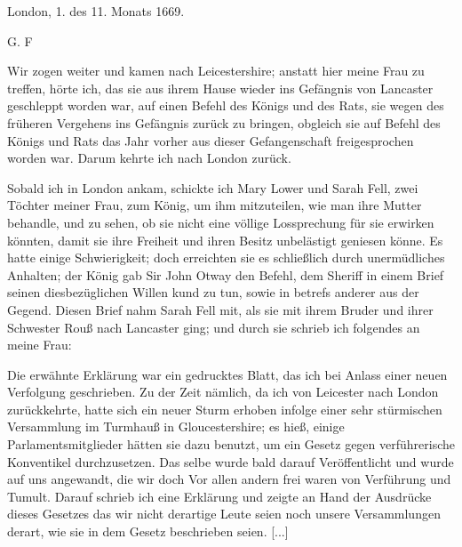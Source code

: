 {  \begin{flushright}
  London, 1. des 11. Monats 1669. 

  G. F 
  \end{flushright}

}

Wir zogen weiter und kamen nach Leicestershire; anstatt
hier meine Frau zu treffen, hörte ich, das sie aus ihrem Hause
wieder ins Gefängnis von Lancaster geschleppt worden war,
auf einen Befehl des Königs und des Rats, sie wegen des
früheren Vergehens ins Gefängnis zurück zu bringen, obgleich
sie auf Befehl des Königs und Rats das Jahr vorher aus dieser
Gefangenschaft freigesprochen worden war. Darum kehrte ich nach
London zurück.

Sobald ich in London ankam, schickte ich Mary Lower und
Sarah Fell, zwei Töchter meiner Frau, zum König, um ihm 
mitzuteilen, wie man ihre Mutter behandle, und zu sehen, ob sie
nicht eine völlige Lossprechung für sie erwirken könnten, damit sie
ihre Freiheit und ihren Besitz unbelästigt geniesen könne. Es
hatte einige Schwierigkeit; doch erreichten sie es schließlich durch
unermüdliches Anhalten; der König gab Sir John Otway den
Befehl, dem Sheriff in einem Brief seinen diesbezüglichen Willen
kund zu tun, sowie in betrefs anderer aus der Gegend. Diesen
Brief nahm Sarah Fell mit, als sie mit ihrem Bruder und ihrer
Schwester Rouß nach Lancaster ging; und durch sie schrieb ich
folgendes an meine Frau:


Die erwähnte Erklärung war ein gedrucktes Blatt, das ich
bei Anlass einer neuen Verfolgung geschrieben. Zu der Zeit
nämlich, da ich von Leicester nach London zurückkehrte, hatte
sich ein neuer Sturm erhoben infolge einer sehr stürmischen
Versammlung im Turmhauß in Gloucestershire; es hieß, einige
Parlamentsmitglieder hätten sie dazu benutzt, um ein Gesetz gegen
verführerische Konventikel durchzusetzen. Das selbe wurde bald
darauf Veröffentlicht und wurde auf uns angewandt, die wir doch
Vor allen andern frei waren von Verführung und Tumult. Darauf
schrieb ich eine Erklärung und zeigte an Hand der Ausdrücke
dieses Gesetzes das wir nicht derartige Leute seien noch
unsere Versammlungen derart, wie sie in dem Gesetz beschrieben
seien. [...]

